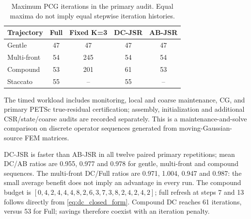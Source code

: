 \documentclass[preprint,12pt,3p]{elsarticle}
\begin{document}
\begin{table}[htbp]
\centering
\scriptsize
\caption{Primary DC-JSR timing audit. Times are means $\pm$ sample standard
 deviations in seconds. Ratios are ratios of mean DC and Full times; wins
 compare paired repetitions. The staccato row has two repeats and no AB or
 Fixed K=3 run.}
\label{tab:dc_primary_performance}
\end{table}

\begin{table}[htbp]
\centering
\small
\caption{Maximum PCG iterations in the primary audit. Equal maxima do not
 imply equal stepwise iteration histories.}
\label{tab:dc_primary_iterations}
\begin{tabular}{lcccc}
\toprule
Trajectory & Full & Fixed K=3 & DC-JSR & AB-JSR \\
\midrule
Gentle & 47 & 47 & 47 & 47 \\
Multi-front & 54 & 245 & 54 & 54 \\
Compound & 53 & 201 & 61 & 53 \\
Staccato & 55 & -- & 55 & -- \\
\bottomrule
\end{tabular}
\end{table}

The timed workload includes monitoring, local and coarse maintenance, CG,
 and primary PETSc true-residual certification; assembly, initialization and
 additional CSR/state/coarse audits are recorded separately. This is a
 maintenance-and-solve comparison on discrete operator sequences generated
 from moving-Gaussian-source FEM matrices.

DC-JSR is faster than AB-JSR in all twelve paired primary repetitions; mean
DC/AB ratios are 0.955, 0.977 and 0.978 for gentle, multi-front and compound
sequences. The multi-front DC/Full ratios are 0.971, 1.004, 0.947 and 0.987:
 the small average benefit does not imply an advantage in every run.
The compound budget is
$[0,4,2,4,4,4,8,2,6,3,7,3,8,2,4,2,4,2]$;
full refresh at steps 7 and 13 follows directly from
\eqref{eq:dc_closed_form}. Compound DC reaches 61 iterations, versus 53 for
Full; savings therefore coexist with an iteration penalty.
\end{document}
